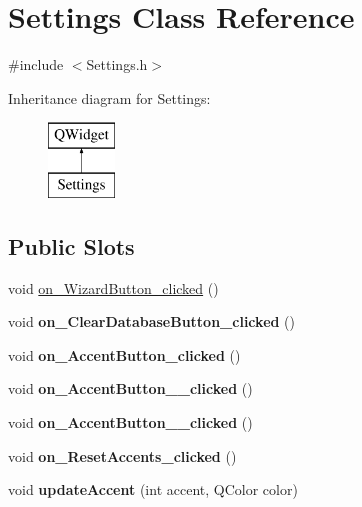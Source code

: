 \hypertarget{class_settings}{}\section{Settings Class Reference}
\label{class_settings}


{\ttfamily \#include $<$Settings.\+h$>$}

Inheritance diagram for Settings\+:\begin{figure}[H]
\begin{center}
\leavevmode
\includegraphics[height=2.000000cm]{class_settings}
\end{center}
\end{figure}
\subsection*{Public Slots}
\begin{DoxyCompactItemize}
\item 
void \hyperlink{class_settings_a02a9fef0e6b5bba3d23049c97b48ef9b}{on\+\_\+\+Wizard\+Button\+\_\+clicked} ()
\item 
\hypertarget{class_settings_a2c9ae14bd4d021a7d113eec562fee091}{}void {\bfseries on\+\_\+\+Clear\+Database\+Button\+\_\+clicked} ()\label{class_settings_a2c9ae14bd4d021a7d113eec562fee091}

\item 
\hypertarget{class_settings_a6596c1fbe0ddfc15b38fc7616c65c016}{}void {\bfseries on\+\_\+\+Accent\+Button\+\_\+clicked} ()\label{class_settings_a6596c1fbe0ddfc15b38fc7616c65c016}

\item 
\hypertarget{class_settings_a7b16f2179c63f5f772d9a3926c110506}{}void {\bfseries on\+\_\+\+Accent\+Button\+\_\+\_\+clicked} ()\label{class_settings_a7b16f2179c63f5f772d9a3926c110506}

\item 
\hypertarget{class_settings_a566ea80ba15c7ed3f929cb095230a479}{}void {\bfseries on\+\_\+\+Accent\+Button\+\_\+\_\+clicked} ()\label{class_settings_a566ea80ba15c7ed3f929cb095230a479}

\item 
\hypertarget{class_settings_a6e6f4afa26d77fa2c5c01dd0ea64d643}{}void {\bfseries on\+\_\+\+Reset\+Accents\+\_\+clicked} ()\label{class_settings_a6e6f4afa26d77fa2c5c01dd0ea64d643}

\item 
\hypertarget{class_settings_ada3bd4508c48cd809c698cdecd8bab11}{}void {\bfseries update\+Accent} (int accent, Q\+Color color)\label{class_settings_ada3bd4508c48cd809c698cdecd8bab11}

\end{DoxyCompactItemize}
